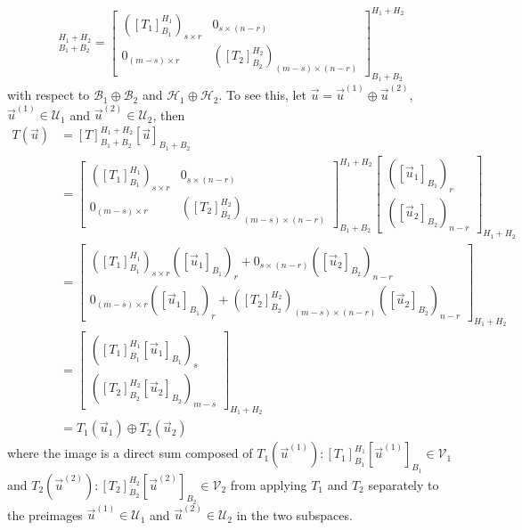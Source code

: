 \begin{align*}
[T]_{B_1 + B_2}^{H_1 + H_2}
=
\begin{bmatrix}
([T_1]_{B_1}^{H_1})_{s \times r} & 0_{s \times (n-r)} \\
0_{(m-s) \times r} & ([T_2]_{B_2}^{H_2})_{(m-s) \times (n-r)}
\end{bmatrix}_{B_1 + B_2}^{H_1 + H_2}
\end{align*}
with respect to $\mathcal{B}_1 \oplus \mathcal{B}_2$ and $\mathcal{H}_1 \oplus \mathcal{H}_2$. To see this, let $\vec{u} = \vec{u}^{(1)} \oplus \vec{u}^{(2)}$, $\vec{u}^{(1)} \in \mathcal{U}_1$ and $\vec{u}^{(2)} \in \mathcal{U}_2$, then
\begin{align*}
T(\vec{u}) &= [T]_{B_1 + B_2}^{H_1 + H_2}[\vec{u}]_{B_1 + B_2} \\ 
&= \begin{bmatrix}
([T_1]_{B_1}^{H_1})_{s \times r} & 0_{s \times (n-r)} \\
0_{(m-s) \times r} & ([T_2]_{B_2}^{H_2})_{(m-s) \times (n-r)}
\end{bmatrix}_{B_1 + B_2}^{H_1 + H_2}
\begin{bmatrix}
([\vec{u}_1]_{B_1})_r \\
([\vec{u}_2]_{B_2})_{n-r}
\end{bmatrix}_{H_1 + H_2} \\
&= 
\begin{bmatrix}
([T_1]_{B_1}^{H_1})_{s \times r}([\vec{u}_1]_{B_1})_r + 0_{s \times (n-r)}([\vec{u}_2]_{B_2})_{n-r} \\
0_{(m-s) \times r}([\vec{u}_1]_{B_1})_r + ([T_2]_{B_2}^{H_2})_{(m-s) \times (n-r)}([\vec{u}_2]_{B_2})_{n-r}
\end{bmatrix}_{H_1 + H_2} \\
&= 
\begin{bmatrix}
([T_1]_{B_1}^{H_1}[\vec{u}_1]_{B_1})_s \\
([T_2]_{B_2}^{H_2}[\vec{u}_2]_{B_2})_{m-s}
\end{bmatrix}_{H_1 + H_2} \\
&= 
T_1(\vec{u}_1) \oplus T_2(\vec{u}_2)
\end{align*}
where the image is a direct sum composed of $T_1(\vec{u}^{(1)}): [T_1]_{B_1}^{H_1}[\vec{u}^{(1)}]_{B_1} \in \mathcal{V}_1$ and $T_2(\vec{u}^{(2)}): [T_2]_{B_2}^{H_2}[\vec{u}^{(2)}]_{B_2} \in \mathcal{V}_2$ from applying $T_1$ and $T_2$ separately to the preimages $\vec{u}^{(1)} \in \mathcal{U}_1$ and $\vec{u}^{(2)} \in \mathcal{U}_2$ in the two subspaces.

